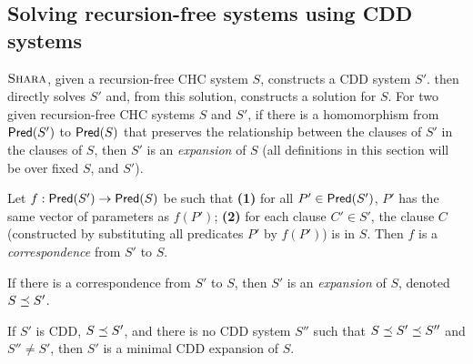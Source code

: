 \subsection{Solving recursion-free systems using CDD systems}
\label{sec:core-solver}

$\textsc{Shara}$, given a recursion-free CHC system $S$,
constructs a CDD system $S'$.
%
\sys then directly solves $S'$ and, from this solution, constructs a solution
for $S$.
For two given recursion-free CHC systems $S$ and $S'$, if
there is a homomorphism from $\mathsf{Pred}( S' )$ to $\mathsf{Pred}( S )$ that
preserves the relationship between the clauses of $S'$ in
the clauses of $S$, then $S'$ is an \emph{expansion} of
$S$ (all definitions in this section will be over fixed
$S$, and $S'$).
\begin{defn}
  \label{defn:expansion}
  Let $f : \mathsf{Pred}( S' ) \to \mathsf{Pred}( S )$ be such that
  \textbf{(1)} for all $P' \in \mathsf{Pred}( S' )$, $P'$ has the
  same vector of parameters as $f(P')$;
  \textbf{(2)} for each clause $C' \in S'$, the clause $C$ (constructed
  by substituting all predicates $P'$ by $f(P')$) is in $S$.
  Then $f$ is a \emph{correspondence} from $S'$ to $S$.
\end{defn}
%
If there is a correspondence from $S'$ to $S$, then $S'$ is an \emph{expansion}
of $S$, denoted $S \preceq S'$.

%
\begin{defn}
  \label{defn:min-expansion}
  If $S'$ is CDD, $S \preceq S'$, and there is no CDD system $S''$ such that $S \preceq S' \preceq S''$ and
  $S'' \neq S'$, then $S'$ is a minimal CDD expansion of $S$.
\end{defn}

